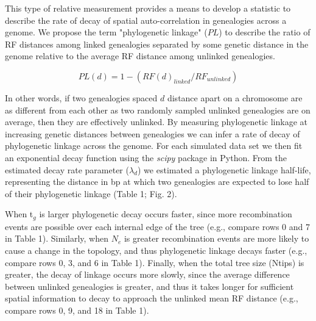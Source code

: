 \documentclass[11pt]{article}
\begin{document}
This type of relative measurement provides a means to develop a statistic to describe the rate of decay of spatial auto-correlation in genealogies across a genome. We propose the term "phylogenetic linkage" ($PL$) to describe the ratio of RF distances among linked genealogies separated by some genetic distance in the genome relative to the average RF distance among unlinked genealogies. 

$$ PL(d) = 1 - (RF(d)_{linked} / RF_{unlinked}) $$

\noindent In other words, if two genealogies spaced $d$ distance apart on a chromosome are as different from each other as two randomly sampled unlinked genealogies are on average, then they are effectively unlinked. By measuring phylogenetic linkage at increasing genetic distances between genealogies we can infer a rate of decay of phylogenetic linkage across the genome. For each simulated data set we then fit an exponential decay function using the \emph{scipy} package in Python. From the estimated decay rate parameter ($\lambda_d$) we estimated a phylogenetic linkage half-life, representing the distance in bp at which two genealogies are expected to lose half of their phylogenetic linkage (Table 1; Fig. 2). 

When t$_g$ is larger phylogenetic decay occurs faster, since more recombination events are possible over each internal edge of the tree (e.g., compare rows 0 and 7 in Table 1). Similarly, when $N_e$ is greater recombination events are more likely to cause a change in the topology, and thus phylogenetic linkage decays faster (e.g., compare rows 0, 3, and 6 in Table 1). Finally, when the total tree size (Ntips) is greater, the decay of linkage occurs more slowly, since the average difference between unlinked genealogies is greater, and thus it takes longer for sufficient spatial information to decay to approach the unlinked mean RF distance (e.g., compare rows 0, 9, and 18 in Table 1). 

\end{document}
